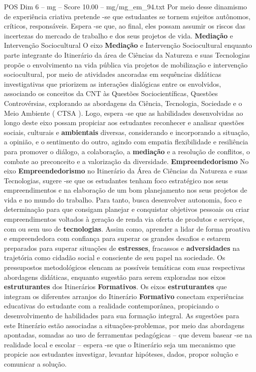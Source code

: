 \begin{textsample}{POS Dim 6 – mg – Score 10.00 – mg/mg\_em\_94.txt}
Por meio desse dinamismo de experiência criativa pretende -se que estudantes se tornem sujeitos autônomos, críticos, responsáveis.
Espera -se que, ao final, eles possam assumir os riscos das incertezas do mercado de trabalho e dos seus projetos de vida. \textbf{Mediação} e Intervenção Sociocultural O eixo \textbf{Mediação} e Intervenção Sociocultural enquanto parte integrante do Itinerário da área de Ciências da Natureza e suas Tecnologias propõe o envolvimento na vida pública via projetos de mobilização e intervenção sociocultural, por meio de atividades ancoradas em sequências didáticas investigativas que priorizem as interações dialógicas entre os envolvidos, associando os conceitos da CNT às Questões Sociocientíficas, Questões Controvérsias, explorando as abordagens da Ciência, Tecnologia, Sociedade e o Meio Ambiente ( CTSA ).
Logo, espera -se que as habilidades desenvolvidas ao longo deste eixo possam propiciar aos estudantes reconhecer e analisar questões sociais, culturais e \textbf{ambientais} diversas, considerando e incorporando a situação, a opinião, e o sentimento do outro, agindo com empatia flexibilidade e resiliência para promover o diálogo, a colaboração, a \textbf{mediação} e a resolução de conflitos, o combate ao preconceito e a valorização da diversidade. \textbf{Empreendedorismo} No eixo \textbf{Empreendedorismo} no Itinerário da Área de Ciências da Natureza e suas Tecnologias, sugere -se que os estudantes tenham foco estratégico nos seus empreendimentos e na elaboração de um bom planejamento nos seus projetos de vida e no mundo do trabalho.
Para tanto, busca desenvolver autonomia, foco e determinação para que consigam planejar e conquistar objetivos pessoais ou criar empreendimentos voltados à geração de renda via oferta de produtos e serviços, com ou sem uso de \textbf{tecnologias}.
Assim como, aprender a lidar de forma proativa e empreendedora com confiança para superar os grandes desafios e estarem preparados para superar situações de \textbf{estresses}, fracassos e \textbf{adversidades} na trajetória como cidadão social e consciente de seu papel na sociedade.
Os pressupostos metodológicos elencam as possíveis temáticas com suas respectivas abordagens didáticas, enquanto sugestão para serem exploradas nos eixos \textbf{estruturantes} dos Itinerários \textbf{Formativos}.
Os eixos \textbf{estruturantes} que integram os diferentes arranjos do Itinerário \textbf{Formativo} conectam experiências educativas do estudante com a realidade contemporânea, propiciando o desenvolvimento de habilidades para sua formação integral.
As sugestões para este Itinerário estão associadas a situações-problemas, por meio das abordagens apontadas, somadas ao uso de ferramentas pedagógicas – que devem basear -se na realidade local e escolar – espera -se que o Itinerário seja um mecanismo que propicie aos estudantes investigar, levantar hipóteses, dados, propor solução e comunicar a solução.

\end{textsample}
